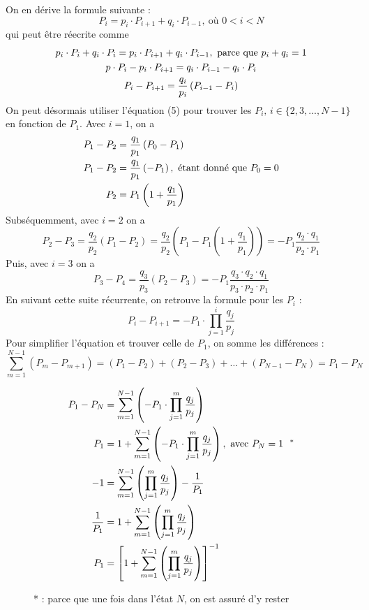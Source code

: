 \documentclass{article}
\begin{document}
\noindent On en dérive la formule suivante :
\[
    P_i=p_i\cdot P_{i+1}+q_i\cdot P_{i-1},\ \text{où } 0<i<N 
\]
qui peut être réecrite comme
\begin{gather}
    p_i\cdot P_i+q_i\cdot P_i=p_i\cdot P_{i+1}+q_i\cdot P_{i-1},\ \text{parce que } p_i+q_i=1 \notag \\
    p\cdot P_i-p_i\cdot P_{i+1}=q_i\cdot P_{i-1}-q_i\cdot P_i \notag \\
    P_i-P_{i+1}=\frac{q_i}{p_i}\left(P_{i-1}-P_i\right)
\end{gather}
On peut désormais utiliser l'équation (5) pour trouver les $P_i,\,i\in\{2,3,...,N-1\}$ 
en fonction de $P_1$. Avec $i=1$, on a
\begin{align}
    P_1-P_2&=\frac{q_1}{p_1}\left(P_0-P_1\right) \notag \\
    P_1-P_2&=\frac{q_1}{p_1}\left(-P_1\right),\ \text{étant donné que } P_0=0 \notag \\
    P_2&=P_1\left(1+\frac{q_1}{p_1}\right) \notag
\end{align}
Subséquemment, avec $i=2$ on a
\[
    P_2-P_3=\frac{q_2}{p_2}(P_1-P_2)=\frac{q_2}{p_2}\left(P_1-P_1\left(1+\frac{q_1}{p_1}\right)\right)=-P_1\frac{q_2\cdot q_1}{p_2\cdot p_1}
\]
Puis, avec $i=3$ on a
\[
    P_3-P_4=\frac{q_3}{p_3}(P_2-P_3)=-P_1\frac{q_3\cdot q_2\cdot q_1}{p_3\cdot p_2\cdot p_1}
\]
En suivant cette suite récurrente, on retrouve la formule pour les $P_i$ :
\begin{equation}
    P_i-P_{i+1}=-P_1\cdot \prod_{j=1}^{i}\frac{q_j}{p_j}
\end{equation}
Pour simplifier l'équation et trouver celle de $P_1$, on somme les différences :
\[
    \sum_{m=1}^{N-1}(P_m-P_{m+1})=(P_1-P_2)+(P_2-P_3)+\dots+(P_{N-1}-P_N)=P_1-P_N
\]
\vspace{-.7cm}
\begin{figure}[h]
    \begin{align}
        P_1-P_N&=\sum_{m=1}^{N-1}\left(-P_1\cdot \prod_{j=1}^{m}\frac{q_j}{p_j}\right) \notag \\
        P_1&=1+\sum_{m=1}^{N-1}\left(-P_1\cdot \prod_{j=1}^{m}\frac{q_j}{p_j}\right),\ \text{avec } P_N=1\ \ ^* \notag \\
        -1&=\sum_{m=1}^{N-1}\left(\prod_{j=1}^{m}\frac{q_j}{p_j}\right)-\frac{1}{P_1} \notag \\
        \frac{1}{P_1}&=1+\sum_{m=1}^{N-1}\left(\prod_{j=1}^{m}\frac{q_j}{p_j}\right) \notag \\
        P_1&=\left[1+\sum_{m=1}^{N-1}\left(\prod_{j=1}^{m}\frac{q_j}{p_j}\right)\right]^{-1}
    \end{align}
    \caption{* : parce que une fois dans l'état $N$, on est assuré d'y rester}
\end{figure}
\end{document}
